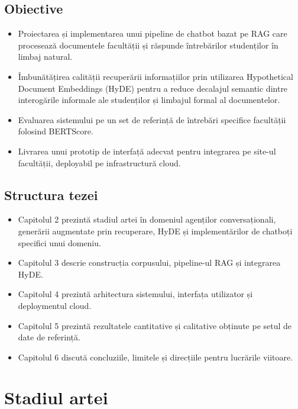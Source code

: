 \documentclass[12pt,a4paper]{report}
\begin{document}
\section{Obiective}
\begin{itemize}
    \item Proiectarea și implementarea unui pipeline de chatbot bazat pe RAG care procesează documentele facultății și răspunde întrebărilor studenților în limbaj natural.
    \item Îmbunătățirea calității recuperării informațiilor prin utilizarea Hypothetical Document Embeddings (HyDE) pentru a reduce decalajul semantic dintre interogările informale ale studenților și limbajul formal al documentelor.
    \item Evaluarea sistemului pe un set de referință de întrebări specifice facultății folosind BERTScore.
    \item Livrarea unui prototip de interfață adecvat pentru integrarea pe site-ul facultății, deployabil pe infrastructură cloud.
\end{itemize}

\section{Structura tezei}
\begin{itemize}
    \item Capitolul 2 prezintă stadiul artei în domeniul agenților conversaționali, generării augmentate prin recuperare, HyDE și implementărilor de chatboți specifici unui domeniu.
    \item Capitolul 3 descrie construcția corpusului, pipeline-ul RAG și integrarea HyDE.
    \item Capitolul 4 prezintă arhitectura sistemului, interfața utilizator și deploymentul cloud.
    \item Capitolul 5 prezintă rezultatele cantitative și calitative obținute pe setul de date de referință.
    \item Capitolul 6 discută concluziile, limitele și direcțiile pentru lucrările viitoare.
\end{itemize}


\chapter{Stadiul artei}
\end{document}
